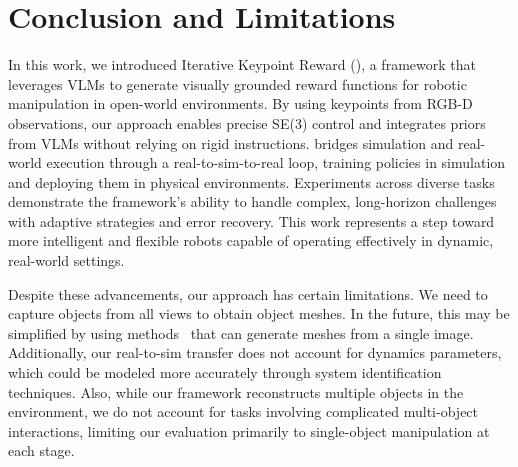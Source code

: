 \section{Conclusion and Limitations}
In this work, we introduced Iterative Keypoint Reward (\algabrvname), a framework that leverages VLMs to generate visually grounded reward functions for robotic manipulation in open-world environments. By using keypoints from RGB-D observations, our approach enables precise SE(3) control and integrates priors from VLMs without relying on rigid instructions. \algabrvname bridges simulation and real-world execution through a real-to-sim-to-real loop, training policies in simulation and deploying them in physical environments. Experiments across diverse tasks demonstrate the framework's ability to handle complex, long-horizon challenges with adaptive strategies and error recovery. This work represents a step toward more intelligent and flexible robots capable of operating effectively in dynamic, real-world settings.


Despite these advancements, our approach has certain limitations. We need to capture objects from all views to obtain object meshes. In the future, this may be simplified by using methods~\cite{liu2023zero} that can generate meshes from a single image. Additionally, our real-to-sim transfer does not account for dynamics parameters, which could be modeled more accurately through system identification techniques. Also, while our framework reconstructs multiple objects in the environment, we do not account for tasks involving complicated multi-object interactions, limiting our evaluation primarily to single-object manipulation at each stage. 
